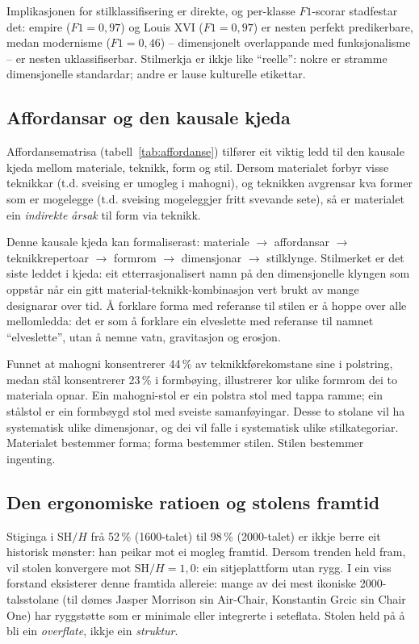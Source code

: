 \documentclass[10pt, a4paper, twocolumn]{article}
\begin{document}
Implikasjonen for stilklassifisering er direkte, og per-klasse $F1$-scorar stadfestar det: empire ($F1 = 0{,}97$) og Louis XVI ($F1 = 0{,}97$) er nesten perfekt predikerbare, medan modernisme ($F1 = 0{,}46$) -- dimensjonelt overlappande med funksjonalisme -- er nesten uklassifiserbar. Stilmerkja er ikkje like ``reelle'': nokre er stramme dimensjonelle standardar; andre er lause kulturelle etikettar.


\subsection{Affordansar og den kausale kjeda}

Affordansematrisa (tabell~\ref{tab:affordanse}) tilfører eit viktig ledd til den kausale kjeda mellom materiale, teknikk, form og stil. Dersom materialet forbyr visse teknikkar (t.d. sveising er umogleg i mahogni), og teknikken avgrensar kva former som er mogelegge (t.d. sveising mogeleggjer fritt svevande sete), så er materialet ein \emph{indirekte årsak} til form via teknikk.

Denne kausale kjeda kan formaliserast: materiale $\rightarrow$ affordansar $\rightarrow$ teknikkrepertoar $\rightarrow$ formrom $\rightarrow$ dimensjonar $\rightarrow$ stilklynge. Stilmerket er det siste leddet i kjeda: eit etterrasjonalisert namn på den dimensjonelle klyngen som oppstår når ein gitt material-teknikk-kombinasjon vert brukt av mange designarar over tid. Å forklare forma med referanse til stilen er å hoppe over alle mellomledda: det er som å forklare ein elveslette med referanse til namnet ``elveslette'', utan å nemne vatn, gravitasjon og erosjon.

Funnet at mahogni konsentrerer 44\,\% av teknikkførekomstane sine i polstring, medan stål konsentrerer 23\,\% i formbøying, illustrerer kor ulike formrom dei to materiala opnar. Ein mahogni-stol er ein polstra stol med tappa ramme; ein stålstol er ein formbøygd stol med sveiste samanføyingar. Desse to stolane vil ha systematisk ulike dimensjonar, og dei vil falle i systematisk ulike stilkategoriar. Materialet bestemmer forma; forma bestemmer stilen. Stilen bestemmer ingenting.


\subsection{Den ergonomiske ratioen og stolens framtid}

Stiginga i $\text{SH}/H$ frå 52\,\% (1600-talet) til 98\,\% (2000-talet) er ikkje berre eit historisk mønster: han peikar mot ei mogleg framtid. Dersom trenden held fram, vil stolen konvergere mot $\text{SH}/H = 1{,}0$: ein sitjeplattform utan rygg. I ein viss forstand eksisterer denne framtida allereie: mange av dei mest ikoniske 2000-talsstolane (til dømes Jasper Morrison sin Air-Chair, Konstantin Grcic sin Chair One) har ryggstøtte som er minimale eller integrerte i seteflata. Stolen held på å bli ein \emph{overflate}, ikkje ein \emph{struktur}.
\end{document}
